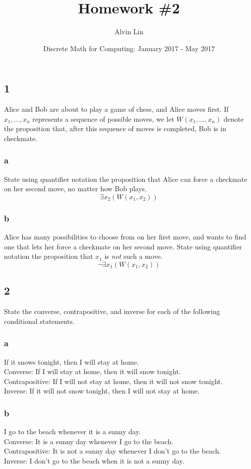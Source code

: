 \documentclass{math}
\title{Homework \#2}
\author{Alvin Lin}
\date{Discrete Math for Computing: January 2017 - May 2017}
\begin{document}
\maketitle

\subsection*{1}
Alice and Bob are about to play a game of chess, and Alice moves first. If
\( x_{1}, \dots, x_{n} \) represents a sequence of possible moves, we let
\( W(x_{1}, \dots, x_{n}) \) denote the proposition that, after this sequence
of moves is completed, Bob is in checkmate.

\subsubsection*{a}
State using quantifier notation the proposition that Alice can force a
checkmate on her second move, no matter how Bob plays.
\[ \exists{x_{2}}(W(x_{1}, x_{2})) \]

\subsubsection*{b}
Alice has many possibilities to choose from on her first move, and wants to
find one that lets her force a checkmate on her second move. State using
quantifier notation the proposition that \( x_{1} \) is \textit{not} such
a move.
\[ \neg{\exists{x_{1}}}(W(x_{1}, x_{2})) \]

\subsection*{2}
State the converse, contrapositive, and inverse for each of the following
conditional statements.

\subsubsection*{a}
If it snows tonight, then I will stay at home. \\
Converse: If I will stay at home, then it will snow tonight. \\
Contrapositive: If I will not stay at home, then it will not snow
tonight. \\
Inverse: If it will not snow tonight, then I will not stay at home.

\subsubsection*{b}
I go to the beach whenever it is a sunny day. \\
Converse: It is a sunny day whenever I go to the beach. \\
Contrapositive: It is not a sunny day whenever I don't go to the beach. \\
Inverse: I don't go to the beach when it is not a sunny day.
\end{document}
